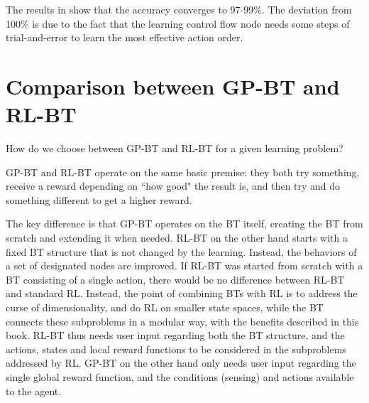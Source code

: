 

The results in \cite{pereira2015framework} show that the accuracy converges to 97-99\%.
The deviation from 100\% is due to the fact that the
learning control flow node needs some steps of trial-and-error to learn the most effective action order.


%
%



\section{Comparison between GP-BT and RL-BT}
How do we choose between GP-BT and RL-BT for a given learning problem?

GP-BT and RL-BT operate on the same basic premise: they both try something, receive a reward depending on ``how good" the result is, and then try and do something different to get a higher reward. 

The key difference is that GP-BT operates on the BT itself, creating the BT from scratch and extending it when needed.
RL-BT on the other hand starts with a fixed BT structure that is not changed by the learning. Instead, the behaviors of 
a set of designated nodes are improved. If RL-BT was started from scratch with a BT consisting of a single action, there
 would be no difference between RL-BT and standard RL. Instead, the point of combining BTs with RL is to 
 address the curse of dimensionality, and do RL on smaller state spaces, while the BT connects these subproblems in a modular way,
 with the benefits described in this book.
 RL-BT thus needs user input regarding both the BT structure, and the actions, states and local reward functions to be considered in the subproblems addressed by RL. GP-BT on the other hand only needs user input regarding the single global reward function, and the conditions (sensing) and actions available to the agent.

